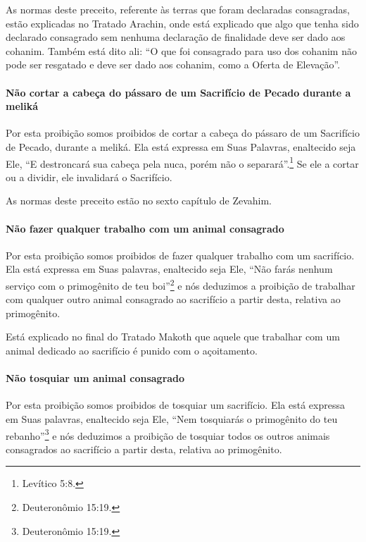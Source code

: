 \begin{multicols}{2}
As normas deste preceito, referente às terras que foram declaradas
consagradas, estão explicadas no Tratado Arachin\starr, onde está explicado
que algo que tenha sido declarado consagrado sem nenhuma declaração de
finalidade deve ser dado aos cohanim\starr. Também está dito ali: ``O que
foi consagrado para uso dos cohanim\starr{} não pode ser resgatado e deve ser
dado aos cohanim\starr, como a Oferta de Elevação''.

\paragraph{Não cortar a cabeça do pássaro de um Sacrifício de Pecado durante a meliká\starr}

Por esta proibição somos proibidos de cortar a cabeça do pássaro de um
Sacrifício de Pecado, durante a meliká\starr. Ela
está expressa em Suas Palavras, enaltecido seja Ele, ``E destroncará sua
cabeça pela nuca, porém não o separará''.\footnote{Levítico 5:8.} Se ele a cortar
ou a dividir, ele invalidará o Sacrifício.

As normas deste preceito estão no sexto capítulo de Zevahim\starr.

\paragraph{Não fazer qualquer trabalho com um animal consagrado}

Por esta proibição somos proibidos de fazer qualquer trabalho com um
sacrifício. Ela está expressa em Suas palavras, enaltecido seja Ele,
``Não farás nenhum serviço com o primogênito de teu boi''\footnote{Deuteronômio
15:19.} e nós deduzimos a proibição de trabalhar com qualquer outro
animal consagrado ao sacrifício a partir desta, relativa ao
primogênito.

Está explicado no final do Tratado Makoth que aquele que trabalhar com
um animal dedicado ao sacrifício é punido com o açoitamento.

\paragraph{Não tosquiar um animal consagrado}

Por esta proibição somos proibidos de tosquiar um sacrifício. Ela está
expressa em Suas palavras, enaltecido seja Ele, ``Nem tosquiarás o
primogênito do teu rebanho''\footnote{Deuteronômio 15:19.} e nós deduzimos a
proibição de tosquiar todos os outros animais consagrados ao sacrifício
a partir desta, relativa ao primogênito.


\end{multicols}
